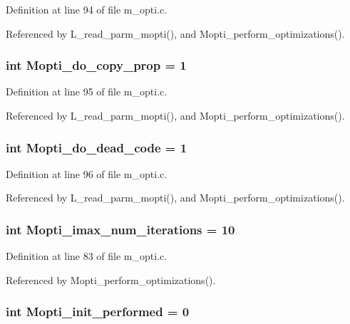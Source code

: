 Definition at line 94 of file m\_\-opti.c.

Referenced by L\_\-read\_\-parm\_\-mopti(), and Mopti\_\-perform\_\-optimizations().
\subsubsection{\setlength{\rightskip}{0pt plus 5cm}int \bf{Mopti\_\-do\_\-copy\_\-prop} = 1}\label{m__opti_8c_b0b90ab8734240df2ec65249ac5b1a32}




Definition at line 95 of file m\_\-opti.c.

Referenced by L\_\-read\_\-parm\_\-mopti(), and Mopti\_\-perform\_\-optimizations().
\subsubsection{\setlength{\rightskip}{0pt plus 5cm}int \bf{Mopti\_\-do\_\-dead\_\-code} = 1}\label{m__opti_8c_319796a6594f619cc0efe25feb90c54d}




Definition at line 96 of file m\_\-opti.c.

Referenced by L\_\-read\_\-parm\_\-mopti(), and Mopti\_\-perform\_\-optimizations().
\subsubsection{\setlength{\rightskip}{0pt plus 5cm}int \bf{Mopti\_\-imax\_\-num\_\-iterations} = 10}\label{m__opti_8c_fd74307d29c92df7f993ee98d027e491}




Definition at line 83 of file m\_\-opti.c.

Referenced by Mopti\_\-perform\_\-optimizations().
\subsubsection{\setlength{\rightskip}{0pt plus 5cm}int \bf{Mopti\_\-init\_\-performed} = 0}\label{m__opti_8c_381daf2a188a9e511257baf6324a6c41}




